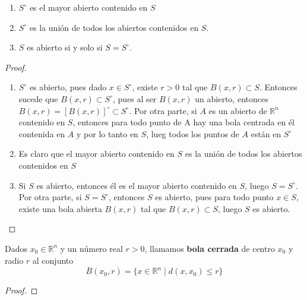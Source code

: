 \begin{proposición}
    \begin{enumerate}
        \item $S^\circ$ es el mayor abierto contenido en $S$
        \item $S^\circ$ es la unión de todos los abiertos contenidos en $S$.
        \item $S$ es abierto si y solo si $S = S^\circ$.
    \end{enumerate}
\end{proposición}
\begin{proof}
    \begin{enumerate}
        \item $S^\circ$ es abierto, pues dado $x \in S^\circ$, existe $r > 0$ tal que $B(x, r) \subset S$. Entonces sucede que $B(x, r) \subset S^\circ$, pues al ser $B(x, r)$ un abierto, entonces $B(x, r) = [B(x, r)]^{\circ} \subset S^\circ$. Por otra parte, si $A$ es un abierto de $\mathbb{R}^n$ contenido en $S$, entonces para todo punto de A hay una bola centrada en él contenida en $A$ y por lo tanto en $S$, lueg todos los puntos de $A$ están en $S^\circ$
        \item Es claro que el mayor abierto contenido en $S$ es la unión de todos los abiertos contenidos en $S$
        \item Si $S$ es abierto, entonces él es el mayor abierto contenido en $S$, luego $S = S^\circ$. Por otra parte, si $S = S^\circ$, entonces $S$ es abierto, pues para todo punto $x \in S$, existe una bola abierta $B(x, r)$ tal que $B(x, r) \subset S$, luego $S$ es abierto.	
    \end{enumerate}
\end{proof}

\begin{definición}
    Dados $x_0 \in \mathbb{R}^n$ y un número real $r > 0$, llamamos \textbf{bola cerrada} de centro $x_0$ y radio $r$ al conjunto
    $$\overline{B}(x_0, r) = \{x \in \mathbb{R}^n \mid d(x, x_0) \leq r\}$$
\end{definición}
\begin{proof}
    
\end{proof}
